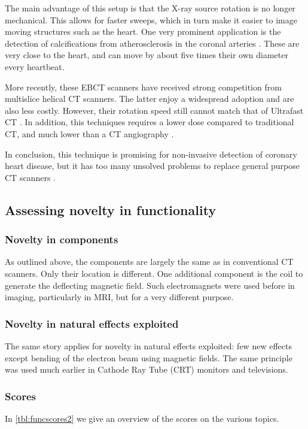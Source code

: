 The main advantage of this setup is that the X-ray source rotation is no longer
mechanical. This allows for faster sweeps, which in turn make it easier to image
moving structures such as the heart. One very prominent application is the
detection of calcifications from atherosclerosis in the coronal arteries
\cite{ultrafastcad}. These are very close to the heart, and can move by about
five times their own diameter every heartbeat. 

More recently, these EBCT scanners have received strong competition from
multislice helical CT scanners. The latter enjoy a widespread adoption and are
also less costly. However, their rotation speed still cannot match that of
Ultrafast CT \cite{ultravshelical}. In addition, this techniques requires a
lower dose compared to traditional CT, and much lower than a CT angiography
\cite{ultralowdose}.

In conclusion, this technique is promising for non-invasive detection of
coronary heart disease, but it has too many unsolved problems to replace general
purpose CT scanners \cite{multictbook}.

\subsection{Assessing novelty in functionality}

\subsubsection{Novelty in components}
As outlined above, the components are largely the same as in conventional CT
scanners. Only their location is different. One additional component is the coil
to generate the deflecting magnetic field. Such electromagnets were used before
in imaging, particularly in MRI, but for a very different purpose.

\subsubsection{Novelty in natural effects exploited}
The same story applies for novelty in natural effects exploited: few new effects
except bending of the electron beam using magnetic fields. The same principle
was used much earlier in Cathode Ray Tube (CRT) monitors and televisions.

\subsubsection{Scores}
In \autoref{tbl:funcscores2} we give an overview of the scores on the various
topics.

